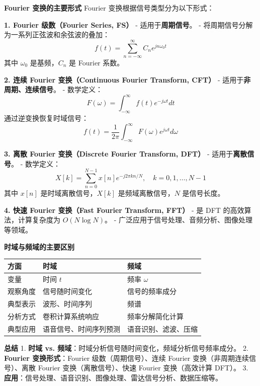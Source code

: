 \textbf{Fourier 变换的主要形式}  
Fourier 变换根据信号类型分为以下形式：  

\textbf{1. Fourier 级数（Fourier Series, FS）}  
- 适用于\textbf{周期信号}。  
- 将周期信号分解为一系列正弦波和余弦波的叠加：
\[
f(t) = \sum_{n=-\infty}^{\infty} C_n e^{j n \omega_0 t}
\]
其中 $\omega_0$ 是基频，$C_n$ 是 Fourier 系数。

\textbf{2. 连续 Fourier 变换（Continuous Fourier Transform, CFT）}  
- 适用于\textbf{非周期、连续信号}。  
- 数学定义：
\[
F(\omega) = \int_{-\infty}^{\infty} f(t) e^{-j\omega t} dt
\]
通过逆变换恢复时域信号：
\[
f(t) = \frac{1}{2\pi} \int_{-\infty}^{\infty} F(\omega) e^{j\omega t} d\omega
\]

\textbf{3. 离散 Fourier 变换（Discrete Fourier Transform, DFT）}  
- 适用于\textbf{离散信号}。  
- 数学定义：
\[
X[k] = \sum_{n=0}^{N-1} x[n] e^{-j 2\pi kn / N}, \quad k = 0, 1, \dots, N-1
\]
其中 $x[n]$ 是时域离散信号，$X[k]$ 是频域离散信号，$N$ 是信号长度。

\textbf{4. 快速 Fourier 变换（Fast Fourier Transform, FFT）}  
- 是 DFT 的高效算法，计算复杂度为 $O(N \log N)$。  
- 广泛应用于信号处理、音频分析、图像处理等领域。

\textbf{时域与频域的主要区别}  
\begin{tabular}{|l|l|l|}
\hline
\textbf{方面} & \textbf{时域} & \textbf{频域} \\ \hline
变量 & 时间 $t$ & 频率 $\omega$ \\ \hline
观察角度 & 信号随时间变化 & 信号的频率成分 \\ \hline
典型表示 & 波形、时间序列 & 频谱 \\ \hline
分析方式 & 卷积计算系统响应 & 频率分解简化计算 \\ \hline
典型应用 & 语音信号、时间序列预测 & 语音识别、滤波、压缩 \\ \hline
\end{tabular}

\textbf{总结}  
1. \textbf{时域 vs. 频域}：时域分析信号随时间变化，频域分析信号频率成分。  
2. \textbf{Fourier 变换形式}：Fourier 级数（周期信号）、连续 Fourier 变换（非周期连续信号）、离散 Fourier 变换（离散信号）、快速 Fourier 变换（高效计算 DFT）。  
3. \textbf{应用}：信号处理、语音识别、图像处理、雷达信号分析、数据压缩等。




